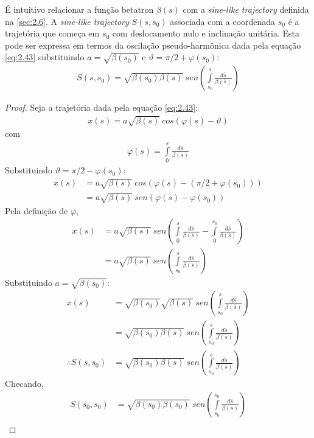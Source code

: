 É intuitivo relacionar a função betatron $\beta(s)$ com a \textit{sine-like trajectory} definida na \autoref{sec:2.6}. A \textit{sine-like trajectory} $S(s,s_0)$ associada com a coordenada $s_0$ é a trajetória que começa em $s_0$ com deslocamento nulo e inclinação unitária. Esta pode ser expressa em termos da oscilação pseudo-harmônica dada pela equação \eqref{eq:2.43} substituindo $a=\sqrt{\beta(s_0)}$ e $\vartheta=\pi/2 + \varphi(s_0)$:
\begin{align}
	S(s,s_0) = \sqrt{\beta(s_0)\beta(s)}\ sen \left(\int\limits_{s_0}^{s} \frac{d\bar{s}}{\beta(\bar{s})}\right)
\end{align}
\begin{proof}
	Seja a trajetória dada pela equação \eqref{eq:2.43}:
	\begin{align*}
		x(s) = a\sqrt{\beta(s)}\ cos(\varphi(s)-\vartheta)
	\end{align*}
	com
	\begin{align*}
		\varphi(s) = \int\limits_{0}^{s} \frac{d\bar{s}}{\beta(\bar{s})}
	\end{align*}
	Substituindo $\vartheta=\pi/2 - \varphi(s_0)$:
	\begin{align*}
		x(s) &= a\sqrt{\beta(s)}\ cos(\varphi(s)-(\pi/2 + \varphi(s_0)))\\
			 &= a\sqrt{\beta(s)}\ sen(\varphi(s) - \varphi(s_0))
	\end{align*}
	Pela definição de $\varphi$,
	\begin{align*}
		x(s) &= a\sqrt{\beta(s)}\ sen\left(\int\limits_{0}^{s} \frac{d\bar{s}}{\beta(\bar{s})} - \int\limits_{0}^{s_0} \frac{d\bar{s}}{\beta(\bar{s})}\right)\\
			 &= a\sqrt{\beta(s)}\ sen\left(\int\limits_{s_0}^{s} \frac{d\bar{s}}{\beta(\bar{s})}\right)
	\end{align*}
	Substituindo $a=\sqrt{\beta(s_0)}$:
	\begin{align*}
		x(s) &= \sqrt{\beta(s_0)}\sqrt{\beta(s)}\ sen\left(\int\limits_{s_0}^{s} \frac{d\bar{s}}{\beta(\bar{s})}\right)\\
			 &= \sqrt{\beta(s_0)\beta(s)}\ sen\left(\int\limits_{s_0}^{s} \frac{d\bar{s}}{\beta(\bar{s})}\right)\\
		\therefore S(s,s_0) &= \sqrt{\beta(s_0)\beta(s)}\ sen\left(\int\limits_{s_0}^{s} \frac{d\bar{s}}{\beta(\bar{s})}\right)
	\end{align*}
	Checando,
	\begin{align*}
		S(s_0,s_0) &= \sqrt{\beta(s_0)\beta(s_0)}\ sen\left(\int\limits_{s_0}^{s_0} \frac{d\bar{s}}{\beta(\bar{s})}\right)\\

\end{align*}
\end{proof}
